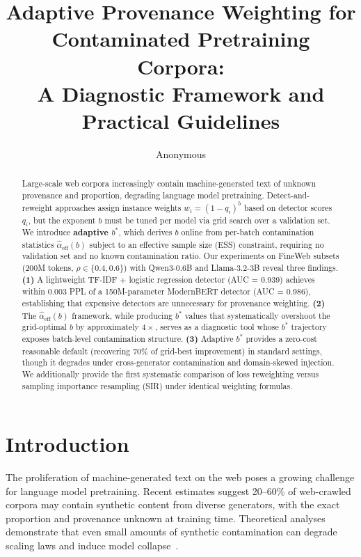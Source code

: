 \documentclass[11pt]{article}
\title{Adaptive Provenance Weighting for Contaminated Pretraining Corpora:\\A Diagnostic Framework and Practical Guidelines}
\author{Anonymous}
\date{}
\begin{document}
\maketitle

\begin{abstract}
Large-scale web corpora increasingly contain machine-generated text of unknown provenance and proportion, degrading language model pretraining.
Detect-and-reweight approaches assign instance weights $w_i = (1-q_i)^b$ based on detector scores $q_i$, but the exponent $b$ must be tuned per model via grid search over a validation set.
We introduce \textbf{adaptive $b^*$}, which derives $b$ online from per-batch contamination statistics $\hat{\alpha}_{\mathrm{eff}}(b)$ subject to an effective sample size (ESS) constraint, requiring no validation set and no known contamination ratio.
Our experiments on FineWeb subsets (200M tokens, $\rho \in \{0.4, 0.6\}$) with Qwen3-0.6B and Llama-3.2-3B reveal three findings.
\textbf{(1)} A lightweight TF-IDF + logistic regression detector (AUC = 0.939) achieves within 0.003 PPL of a 150M-parameter ModernBERT detector (AUC = 0.986), establishing that expensive detectors are unnecessary for provenance weighting.
\textbf{(2)} The $\hat{\alpha}_{\mathrm{eff}}(b)$ framework, while producing $b^*$ values that systematically overshoot the grid-optimal $b$ by approximately $4\times$, serves as a diagnostic tool whose $b^*$ trajectory exposes batch-level contamination structure.
\textbf{(3)} Adaptive $b^*$ provides a zero-cost reasonable default (recovering 70\% of grid-best improvement) in standard settings, though it degrades under cross-generator contamination and domain-skewed injection.
We additionally provide the first systematic comparison of loss reweighting versus sampling importance resampling (SIR) under identical weighting formulas.
\end{abstract}

\section{Introduction}
\label{sec:intro}

The proliferation of machine-generated text on the web poses a growing challenge for language model pretraining.
Recent estimates suggest 20--60\% of web-crawled corpora may contain synthetic content from diverse generators, with the exact proportion and provenance unknown at training time.
Theoretical analyses demonstrate that even small amounts of synthetic contamination can degrade scaling laws and induce model collapse~\citep{shumailov2024strong}.
\end{document}
